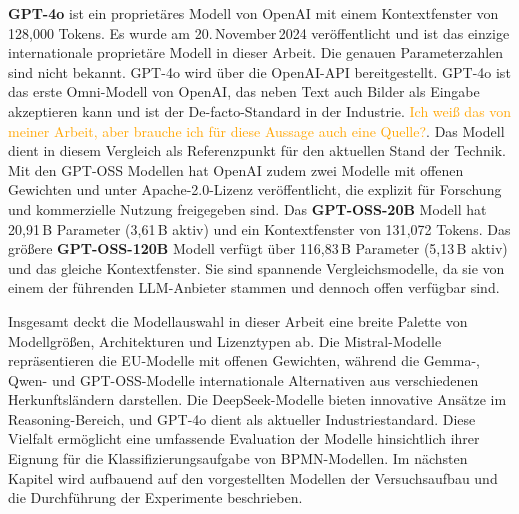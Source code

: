 \textbf{GPT-4o} \cite{openai-hello-gpt-4o} ist ein proprietäres Modell von OpenAI mit einem Kontextfenster von 128{,}000 Tokens. Es wurde am 20.\,November\,2024 veröffentlicht und ist das einzige internationale proprietäre Modell in dieser Arbeit. Die genauen Parameterzahlen sind nicht bekannt. GPT-4o wird über die OpenAI-API bereitgestellt. GPT-4o ist das erste Omni-Modell von OpenAI, das neben Text auch Bilder als Eingabe akzeptieren kann und ist der De-facto-Standard in der Industrie. \textcolor{orange}{Ich weiß das von meiner Arbeit, aber brauche ich für diese Aussage auch eine Quelle?}. Das Modell dient in diesem Vergleich als Referenzpunkt für den aktuellen Stand der Technik. Mit den GPT-OSS Modellen \cite{OpenAI_GPTOSS_ModelCard_2025} hat OpenAI zudem zwei Modelle mit offenen Gewichten und unter Apache-2.0-Lizenz veröffentlicht, die explizit für Forschung und kommerzielle Nutzung freigegeben sind. Das \textbf{GPT-OSS-20B} Modell hat 20,91\,B Parameter (3,61\,B aktiv) und ein Kontextfenster von 131{,}072 Tokens. Das größere \textbf{GPT-OSS-120B} Modell verfügt über 116,83\,B Parameter (5,13\,B aktiv) und das gleiche Kontextfenster. Sie sind spannende Vergleichsmodelle, da sie von einem der führenden \ac{LLM}-Anbieter stammen und dennoch offen verfügbar sind.

Insgesamt deckt die Modellauswahl in dieser Arbeit eine breite Palette von Modellgrößen, Architekturen und Lizenztypen ab. Die Mistral-Modelle repräsentieren die \ac{EU}-Modelle mit offenen Gewichten, während die Gemma-, Qwen- und GPT-OSS-Modelle internationale Alternativen aus verschiedenen Herkunftsländern darstellen. Die DeepSeek-Modelle bieten innovative Ansätze im Reasoning-Bereich, und GPT-4o dient als aktueller Industriestandard. Diese Vielfalt ermöglicht eine umfassende Evaluation der Modelle hinsichtlich ihrer Eignung für die Klassifizierungsaufgabe von \ac{BPMN}-Modellen. Im nächsten Kapitel wird aufbauend auf den vorgestellten Modellen der Versuchsaufbau und die Durchführung der Experimente beschrieben.